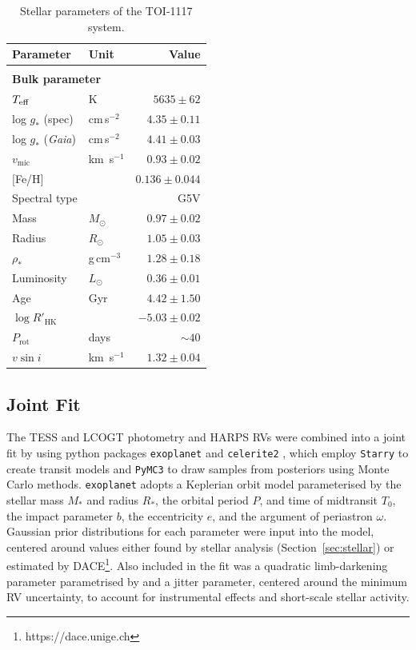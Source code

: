 \documentclass[fleqn,usenatbib,useAMS]{mnras}
\begin{document}
\begin{table}
 \caption{Stellar parameters of the TOI-1117 system.}
 \label{table 2}
 \centering
  \begin{tabular}{llr}
   \hline
   Parameter & Unit & Value \\
   \hline\\
   \multicolumn{2}{l}{\textbf{Bulk parameter}}\\
   $T_{\rm eff}$& K & $5635\pm 62$\\
   log $g_*$ (spec) & cm\,s$^{-2}$ & $4.35\pm 0.11$\\
   log $g_*$ (\textit{Gaia}) & cm\,s$^{-2}$ & $4.41\pm 0.03$\\
   $v_\mathrm{mic}$ & km~s$^{-1}$        & $0.93  \pm 0.02$\\ 
   $[$Fe/H$]$ & & $0.136\pm0.044$\\
   Spectral type & & G5V\\
   Mass & $M_{\odot}$ & $0.97\pm0.02$\\
   Radius & $R_{\odot}$ & $1.05\pm0.03$\\
   $\rho_*$ & g\,cm$^{-3}$ & $1.28\pm0.18$\\
   Luminosity & $L_\odot$ & $0.36\pm0.01$\\
   Age & Gyr & $4.42\pm1.50$\\
   $\log{R'_\text{HK}}$ & & $-5.03\pm0.02$\\
   $P_\text{rot}$ & days & $\sim40$\\
   $v \sin\textit{i}$ & km~s$^{-1}$ & $1.32\pm0.04$\\
   \hline
 \end{tabular}
\end{table}



\subsection{Joint Fit}
\label{sec:jointfit}

The TESS and LCOGT photometry and HARPS RVs were combined into a joint fit by using python packages \texttt{exoplanet} \citep{F-M2021} and \texttt{celerite2} \citep{celerite2}, which employ \texttt{Starry} \citep{starry} to create transit models and \texttt{PyMC3} \citep{pymc3} to draw samples from posteriors using Monte Carlo methods. \texttt{exoplanet} adopts a Keplerian orbit model parameterised by the stellar mass $M_\ast$ and radius $R_\ast$, the orbital period $P$, and time of midtransit $T_0$, the impact parameter $b$, the eccentricity $e$, and the argument of periastron $\omega$. Gaussian prior distributions for each parameter were input into the model, centered around values either found by stellar analysis (Section~\ref{sec:stellar}) or estimated by DACE\footnote{https://dace.unige.ch}. Also included in the fit was a quadratic limb-darkening parameter parametrised by \citet{Kipping} and a jitter parameter, centered around the minimum RV uncertainty, to account for instrumental effects and short-scale stellar activity.
\end{document}
